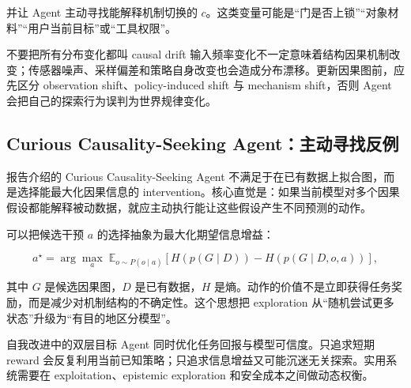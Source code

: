 并让 Agent 主动寻找能解释机制切换的 $c$。这类变量可能是“门是否上锁”“对象材料”“用户当前目标”或“工具权限”。

\begin{warningbox}{不要把所有分布变化都叫 causal drift}
输入频率变化不一定意味着结构因果机制改变；传感器噪声、采样偏差和策略自身改变也会造成分布漂移。更新因果图前，应先区分 observation shift、policy-induced shift 与 mechanism shift，否则 Agent 会把自己的探索行为误判为世界规律变化。
\end{warningbox}


\subsection{Curious Causality-Seeking Agent：主动寻找反例}

报告介绍的 Curious Causality-Seeking Agent 不满足于在已有数据上拟合图，而是选择能最大化因果信息的 intervention。核心直觉是：如果当前模型对多个因果假设都能解释被动数据，就应主动执行能让这些假设产生不同预测的动作。



可以把候选干预 $a$ 的选择抽象为最大化期望信息增益：

$$
a^{\star}=\arg\max_a\;\mathbb{E}_{o\sim P(o\mid a)}
\left[H\!\left(p(G\mid D)\right)-H\!\left(p(G\mid D,o,a)\right)\right],
$$

其中 $G$ 是候选因果图，$D$ 是已有数据，$H$ 是熵。动作的价值不是立即获得任务奖励，而是减少对机制结构的不确定性。这个思想把 exploration 从“随机尝试更多状态”升级为“有目的地区分模型”。

\begin{importantbox}{自我改进中的双层目标}
Agent 同时优化任务回报与模型可信度。只追求短期 reward 会反复利用当前已知策略；只追求信息增益又可能沉迷无关探索。实用系统需要在 exploitation、epistemic exploration 和安全成本之间做动态权衡。
\end{importantbox}


